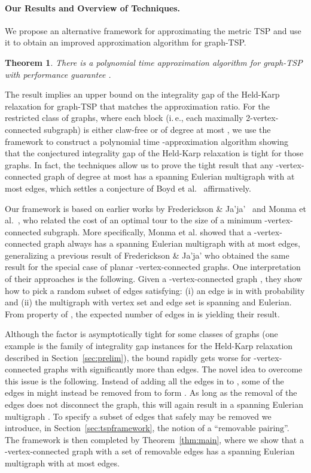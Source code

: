\documentclass[letterpaper,11pt]{article}
\newtheorem{theorem}{Theorem}[section]
\newcommand{\MS}{\ensuremath{\mbox{removable pairing}}\xspace}
\newcommand{\TSP}{graph-TSP\xspace}
\begin{document}
\paragraph{Our Results and Overview of Techniques.}
    We propose an alternative framework for approximating the metric
    TSP and use it to obtain  an improved approximation
    algorithm for \TSP.
    \begin{theorem}\label{thm:approximationratio}
      There is a polynomial time approximation algorithm for \TSP with
      performance guarantee .
    \end{theorem}
    The result implies an upper bound on the integrality gap of the Held-Karp
    relaxation for \TSP that matches the approximation ratio.
    For the restricted class of graphs, where each block (i.\,e., each
    maximally 2-vertex-connected subgraph) is either claw-free or of
    degree at most , we use the framework to construct a polynomial
    time -approximation algorithm showing that the conjectured
    integrality gap of the Held-Karp relaxation is tight for those
    graphs. In fact, the techniques allow us to prove the tight result
    that any -vertex-connected graph of degree at most  has a
    spanning Eulerian multigraph with at most  edges, which
    settles a conjecture of Boyd et al.~\cite{BSSS11} affirmatively.

    Our framework is based on earlier works by Frederickson \&
    Ja'ja'~\cite{FJJ89} and Monma et al.~\cite{MMP90}, who related the
    cost of an optimal tour to the size of a minimum -vertex-connected
    subgraph.  More specifically, Monma et al. showed that a
    -vertex-connected graph  always has a spanning Eulerian
    multigraph with at most  edges, generalizing a
    previous result of Frederickson \& Ja'ja' who obtained
    the same result for the special case of planar -vertex-connected
    graphs.
    One interpretation of their approaches is the following.  Given a
    -vertex-connected graph , they show how to pick a random
    subset  of edges satisfying: (i) an edge is in  with probability
     and (ii) the multigraph  with vertex set  and edge set  is spanning and Eulerian. From property  of
    , the expected number of edges in  is  yielding
    their result.

    Although the factor  is asymptotically tight for some classes of
    graphs (one example is the family of integrality gap instances for the
    Held-Karp relaxation described in Section~\ref{sec:prelim}), the bound
    rapidly gets worse for -vertex-connected graphs with significantly
    more than  edges. The novel idea to overcome this issue is the
    following.  Instead of adding all the edges in  to , some of the
    edges in  might instead be removed from  to form . As long as
    the removal of the edges does not disconnect the graph, this will
    again result in a spanning Eulerian multigraph . To specify a
    subset  of edges that safely may be removed we introduce, in
    Section~\ref{sec:tspframework}, the notion of a ``\MS''. The framework
    is then completed by Theorem~\ref{thm:main}, where we show that a
    -vertex-connected graph  with a set  of removable edges
    has a spanning Eulerian multigraph with at most 
    edges.
\end{document}
